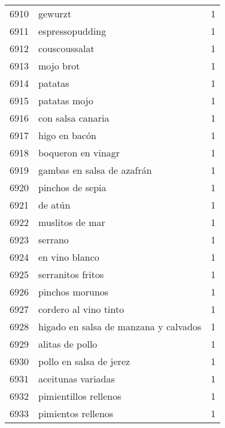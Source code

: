 \begin{tabular}{llr}
6910 &                                            gewurzt &      1 \\
6911 &                                    espressopudding &      1 \\
6912 &                                      couscoussalat &      1 \\
6913 &                                          mojo brot &      1 \\
6914 &                                            patatas &      1 \\
6915 &                                       patatas mojo &      1 \\
6916 &                                  con salsa canaria &      1 \\
6917 &                                      higo en bacón &      1 \\
6918 &                                 boqueron en vinagr &      1 \\
6919 &                         gambas en salsa de azafrán &      1 \\
6920 &                                   pinchos de sepia &      1 \\
6921 &                                            de atún &      1 \\
6922 &                                    muslitos de mar &      1 \\
6923 &                                            serrano &      1 \\
6924 &                                     en vino blanco &      1 \\
6925 &                                  serranitos fritos &      1 \\
6926 &                                    pinchos morunos &      1 \\
6927 &                              cordero al vino tinto &      1 \\
6928 &              higado en salsa de manzana y calvados &      1 \\
6929 &                                    alitas de pollo &      1 \\
6930 &                            pollo en salsa de jerez &      1 \\
6931 &                                 aceitunas variadas &      1 \\
6932 &                              pimientillos rellenos &      1 \\
6933 &                                 pimientos rellenos &      1 \\

\end{tabular}
